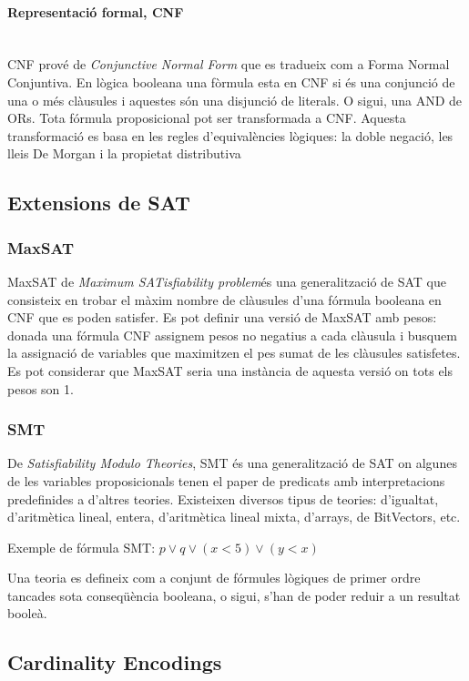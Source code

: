 \documentclass[11pt,a4paper,twoside]{report}
\begin{document}
  \paragraph*{Representació formal, CNF}~\\

  CNF prové de \textit{Conjunctive Normal Form} que es tradueix com a Forma Normal Conjuntiva. En lògica booleana una fòrmula esta en CNF si és una conjunció de una o més clàusules i aquestes són una disjunció de literals. O sigui, una AND de ORs. 
  Tota fórmula proposicional pot ser transformada a CNF. Aquesta transformació es basa en les regles d'equivalències lògiques: la doble negació, les lleis De Morgan i la propietat distributiva  
  \subsection{Extensions de SAT}
  \subsubsection{MaxSAT}
  MaxSAT de \textit{Maximum SATisfiability problem}és una generalització de SAT que consisteix en trobar el màxim nombre de clàusules d'una fórmula booleana en CNF que es poden satisfer. 
  Es pot definir una versió de MaxSAT amb pesos: donada una fórmula CNF assignem pesos no negatius a cada clàusula i busquem la assignació de variables que maximitzen el pes sumat de les clàusules satisfetes. 
  Es pot considerar que MaxSAT seria una instància de aquesta versió on tots els pesos son 1. 
  \subsubsection{SMT}
  De \textit{Satisfiability Modulo Theories}, SMT és una generalització de SAT on algunes de les variables proposicionals tenen el paper de predicats amb interpretacions predefinides a d'altres teories. Existeixen diversos tipus de teories: d'igualtat, d'aritmètica lineal, entera, d'aritmètica lineal mixta, d'arrays, de BitVectors, etc.
  
  Exemple de fórmula SMT: $p \vee q \vee (x<5) \vee (y<x)$

  Una teoria es defineix com a conjunt de fórmules lògiques de primer ordre tancades sota conseqüència booleana, o sigui, s'han de poder reduir a un resultat booleà. 
  \subsection{Cardinality Encodings}
  
\end{document}
